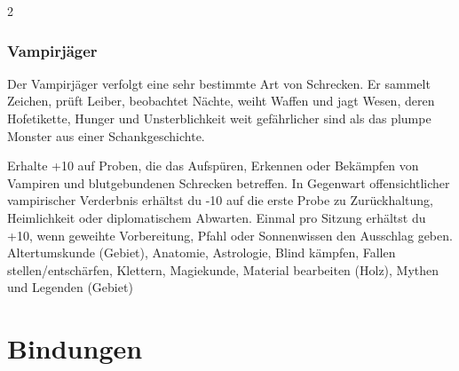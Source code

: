 {\begin{multicols*}{2}
        \subsubsection*{Vampirjäger}
        Der Vampirjäger verfolgt eine sehr bestimmte Art von Schrecken. Er sammelt Zeichen, prüft Leiber, beobachtet Nächte, weiht Waffen und jagt Wesen, deren Hofetikette, Hunger und Unsterblichkeit weit gefährlicher sind als das plumpe Monster aus einer Schankgeschichte.

        \wegespielwertebox
        {Erhalte +10 auf Proben, die das Aufspüren, Erkennen oder Bekämpfen von Vampiren und blutgebundenen Schrecken betreffen.}
        {In Gegenwart offensichtlicher vampirischer Verderbnis erhältst du -10 auf die erste Probe zu Zurückhaltung, Heimlichkeit oder diplomatischem Abwarten.}
        {Einmal pro Sitzung erhältst du +10, wenn geweihte Vorbereitung, Pfahl oder Sonnenwissen den Ausschlag geben.}
        {Altertumskunde (Gebiet), Anatomie, Astrologie, Blind kämpfen, Fallen stellen/entschärfen, Klettern, Magiekunde, Material bearbeiten (Holz), Mythen und Legenden (Gebiet)}

    \end{multicols*}
}


\section{Bindungen}\label{sec:bindungen}

